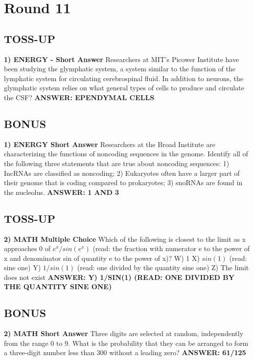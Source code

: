 \documentclass{article}
\begin{document}
\section*{Round 11}

\subsection*{TOSS-UP}
\textbf{1) ENERGY - Short Answer}
Researchers at MIT's Picower Institute have been studying the glymphatic system, a system similar to the function of the lymphatic system for circulating cerebrospinal fluid. In addition to neurons, the glymphatic system relies on what general types of cells to produce and circulate the CSF?
\textbf{ANSWER: EPENDYMAL CELLS}

\subsection*{BONUS}
\textbf{1) ENERGY Short Answer} Researchers at the Broad Institute are characterizing the functions of noncoding sequences in the genome. Identify all of the following three statements that are true about noncoding sequences: 1) IncRNAs are classified as noncoding; 2) Eukaryotes often have a larger part of their genome that is coding compared to prokaryotes; 3) snoRNAs are found in the nucleolus.
\textbf{ANSWER: 1 AND 3}

\newpage

\subsection*{TOSS-UP}
\textbf{2) MATH Multiple Choice} Which of the following is closest to the limit as x approaches 0 of $e^{x}/sin(e^{x})$ (read: the fraction with numerator e to the power of x and denominator sin of quantity e to the power of x)?
W) 1
X) $sin(1)$ (read: sine one)
Y) $1/sin(1)$ (read: one divided by the quantity sine one)
Z) The limit does not exist
\textbf{ANSWER: Y) 1/SIN(1) (READ: ONE DIVIDED BY THE QUANTITY SINE ONE)}

\subsection*{BONUS}
\textbf{2) MATH Short Answer} Three digits are selected at random, independently from the range 0 to 9. What is the probability that they can be arranged to form a three-digit number less than 300 without a leading zero?
\textbf{ANSWER: 61/125}
\end{document}
